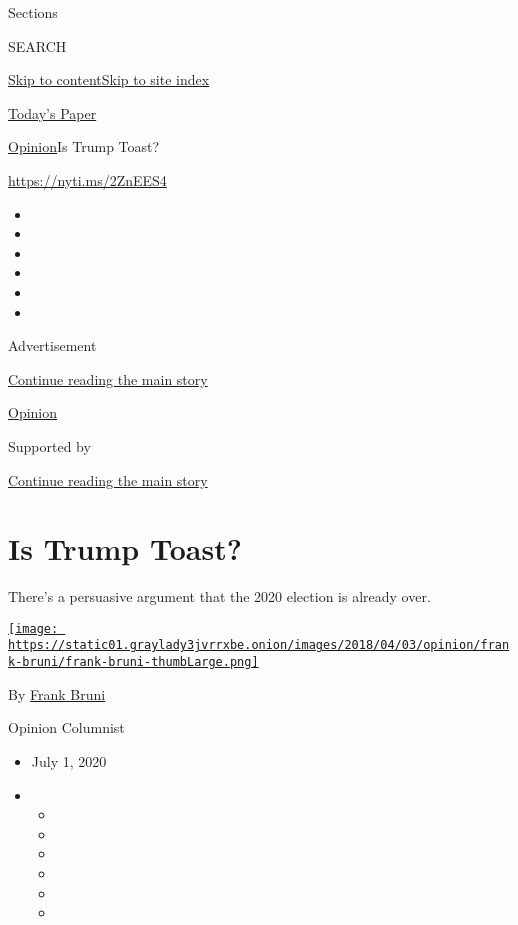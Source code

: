 Sections

SEARCH

\protect\hyperlink{site-content}{Skip to
content}\protect\hyperlink{site-index}{Skip to site index}

\href{https://myaccount.nytimes3xbfgragh.onion/auth/login?response_type=cookie\&client_id=vi}{}

\href{https://www.nytimes3xbfgragh.onion/section/todayspaper}{Today's
Paper}

\href{/section/opinion}{Opinion}\textbar{}Is Trump Toast?

\href{https://nyti.ms/2ZnEES4}{https://nyti.ms/2ZnEES4}

\begin{itemize}
\item
\item
\item
\item
\item
\item
\end{itemize}

Advertisement

\protect\hyperlink{after-top}{Continue reading the main story}

\href{/section/opinion}{Opinion}

Supported by

\protect\hyperlink{after-sponsor}{Continue reading the main story}

\hypertarget{is-trump-toast}{%
\section{Is Trump Toast?}\label{is-trump-toast}}

There's a persuasive argument that the 2020 election is already over.

\href{https://www.nytimes3xbfgragh.onion/by/frank-bruni}{\texttt{[image: https://static01.graylady3jvrrxbe.onion/images/2018/04/03/opinion/frank-bruni/frank-bruni-thumbLarge.png]}}

By \href{https://www.nytimes3xbfgragh.onion/by/frank-bruni}{Frank Bruni}

Opinion Columnist

\begin{itemize}
\item
  July 1, 2020
\item
  \begin{itemize}
  \item
  \item
  \item
  \item
  \item
  \item
  \end{itemize}
\end{itemize}


